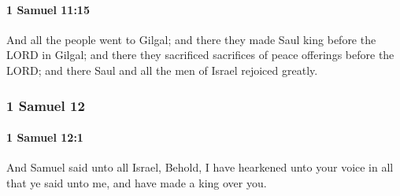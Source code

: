 		\paragraph{1 Samuel 11:15} %
			\label{1SAMUEL-11-15}

			And all the people went to Gilgal; and there they made Saul king before the LORD in Gilgal; and there they sacrificed sacrifices of peace offerings before the LORD; and there Saul and all the men of Israel rejoiced greatly.

	\subsubsection{1 Samuel 12} %
		\label{1SAMUEL-12}

		\paragraph{1 Samuel 12:1} %
			\label{1SAMUEL-12-1}

			And Samuel said unto all Israel, Behold, I have hearkened unto your voice in all that ye said unto me, and have made a king over you.

